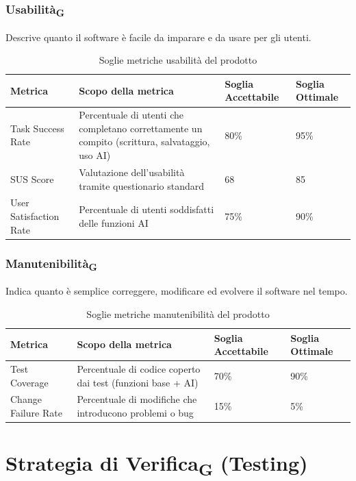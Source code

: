 \documentclass[11pt,a4paper]{article}
\newcommand{\gls}[1]{#1\textsubscript{G}}
\begin{document}
\subsubsection{Usabilità\textsubscript{G}}
Descrive quanto il software è facile da imparare e da usare per gli utenti.
\begin{table}[H]
\centering
\renewcommand{\arraystretch}{1.5}
\begin{tabular}{|M{0.25\textwidth}|M{0.35\textwidth}|M{0.15\textwidth}|M{0.15\textwidth}|}
\hline
\textbf{Metrica} & \textbf{Scopo della metrica} & \textbf{Soglia Accettabile} & \textbf{Soglia Ottimale} \\
\hline
Task Success Rate & Percentuale di utenti che completano correttamente un compito (scrittura, salvataggio, uso AI) & 80\% & 95\% \\ \hline
SUS Score & Valutazione dell’usabilità tramite questionario standard & 68 & 85 \\ \hline
User Satisfaction Rate & Percentuale di utenti soddisfatti delle funzioni AI & 75\% & 90\% \\
\hline
\end{tabular}
\caption{Soglie metriche usabilità del prodotto}
\end{table}

\subsubsection{Manutenibilità\textsubscript{G}}
Indica quanto è semplice correggere, modificare ed evolvere il software nel tempo.
\begin{table}[H]
\centering
\renewcommand{\arraystretch}{1.5}
\begin{tabular}{|M{0.25\textwidth}|M{0.35\textwidth}|M{0.15\textwidth}|M{0.15\textwidth}|}
\hline
\textbf{Metrica} & \textbf{Scopo della metrica} & \textbf{Soglia Accettabile} & \textbf{Soglia Ottimale} \\
\hline
Test Coverage & Percentuale di codice coperto dai test (funzioni base + AI) & 70\% & 90\% \\ \hline
Change Failure Rate & Percentuale di modifiche che introducono problemi o bug & 15\% & 5\% \\
\hline
\end{tabular}
\caption{Soglie metriche manutenibilità del prodotto}
\end{table}

\newpage
\section{Strategia di \gls{Verifica} (Testing)}
\end{document}
